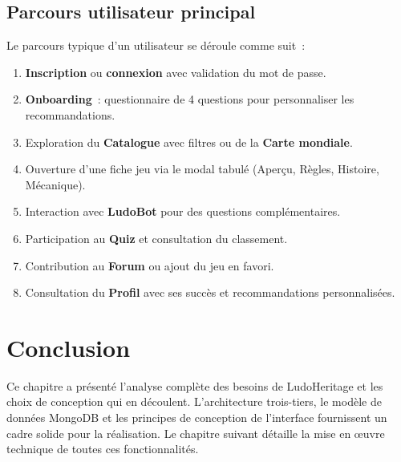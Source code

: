 \subsection{Parcours utilisateur principal}

Le parcours typique d'un utilisateur se déroule comme suit~:

\begin{enumerate}
    \item \textbf{Inscription} ou \textbf{connexion} avec validation du mot de passe.
    \item \textbf{Onboarding}~: questionnaire de 4 questions pour personnaliser les recommandations.
    \item Exploration du \textbf{Catalogue} avec filtres ou de la \textbf{Carte mondiale}.
    \item Ouverture d'une fiche jeu via le modal tabulé (Aperçu, Règles, Histoire, Mécanique).
    \item Interaction avec \textbf{LudoBot} pour des questions complémentaires.
    \item Participation au \textbf{Quiz} et consultation du classement.
    \item Contribution au \textbf{Forum} ou ajout du jeu en favori.
    \item Consultation du \textbf{Profil} avec ses succès et recommandations personnalisées.
\end{enumerate}

\section{Conclusion}

Ce chapitre a présenté l'analyse complète des besoins de LudoHeritage et les choix de conception
qui en découlent. L'architecture trois-tiers, le modèle de données MongoDB et les principes de
conception de l'interface fournissent un cadre solide pour la réalisation. Le chapitre suivant
détaille la mise en œuvre technique de toutes ces fonctionnalités.
